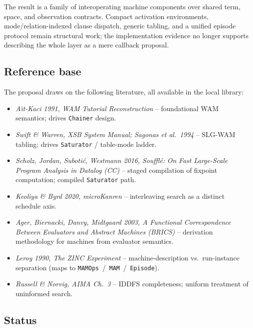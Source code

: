 \documentclass[11pt]{article}
\newcommand{\code}[1]{\texttt{#1}}
\begin{document}
The result is a family of interoperating machine components over shared term,
space, and observation contracts.  Compact activation environments,
mode/relation-indexed clause dispatch, generic tabling, and a unified episode
protocol remain structural work; the implementation evidence no longer
supports describing the whole layer as a mere callback proposal.

\subsection{Reference base}

The proposal draws on the following literature, all available in the
local library:

\begin{itemize}
\item \emph{A\"{\i}t-Kaci 1991, WAM Tutorial Reconstruction} --
  foundational WAM semantics; drives \code{Chainer} design.
\item \emph{Swift \& Warren, XSB System Manual; Sagonas et al.\ 1994} --
  SLG-WAM tabling; drives \code{Saturator} / table-mode ladder.
\item \emph{Scholz, Jordan, Suboti\'c, Westmann 2016, Soufflé: On Fast
  Large-Scale Program Analysis in Datalog (CC)} -- staged compilation
  of fixpoint computation; compiled \code{Saturator} path.
\item \emph{Keoliya \& Byrd 2020, microKanren} -- interleaving search
  as a distinct schedule axis.
\item \emph{Ager, Biernacki, Danvy, Midtgaard 2003, A Functional
  Correspondence Between Evaluators and Abstract Machines (BRICS)} --
  derivation methodology for machines from evaluator semantics.
\item \emph{Leroy 1990, The ZINC Experiment} -- machine-description
  vs.\ run-instance separation (maps to
  \code{MAMOps}~/~\code{MAM}~/~\code{Episode}).
\item \emph{Russell \& Norvig, AIMA Ch.~3} -- IDDFS completeness;
  uniform treatment of uninformed search.
\end{itemize}

\subsection{Status}
\end{document}

